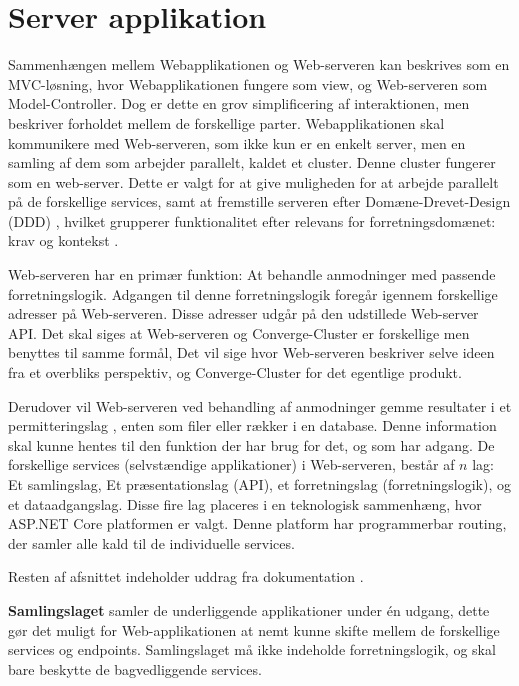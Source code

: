 
\section{Server applikation}

Sammenhængen mellem Webapplikationen og Web-serveren kan beskrives som en MVC-løsning, hvor Webapplikationen fungere som view, og Web-serveren som Model-Controller. Dog er dette en grov simplificering af interaktionen, men beskriver forholdet mellem de forskellige parter. Webapplikationen skal kommunikere med Web-serveren, som ikke kun er en enkelt server, men en samling af dem som arbejder parallelt, kaldet et cluster. Denne cluster fungerer som en web-server. Dette er valgt for at give muligheden for at arbejde parallelt på de forskellige services, samt at fremstille serveren efter Domæne-Drevet-Design (DDD) \cite[DDD]{converge-terms}, hvilket grupperer funktionalitet efter relevans for forretningsdomænet: krav og kontekst \cite{documentation-kravspec}.

Web-serveren har en primær funktion: At behandle anmodninger med passende forretningslogik. Adgangen til denne forretningslogik foregår igennem forskellige adresser på Web-serveren. Disse adresser udgår på den udstillede Web-server API. Det skal siges at Web-serveren og Converge-Cluster er forskellige men benyttes til samme formål, Det vil sige hvor Web-serveren beskriver selve ideen fra et overbliks perspektiv, og Converge-Cluster for det egentlige produkt.

Derudover vil Web-serveren ved behandling af anmodninger gemme resultater i et permitteringslag \cite[Permitteringslag]{converge-terms}, enten som filer eller rækker i en database. Denne information skal kunne hentes til den funktion der har brug for det, og som har adgang. De forskellige services (selvstændige applikationer) i Web-serveren,  består af $n$ lag: Et samlingslag, Et præsentationslag (API), et forretningslag (forretningslogik), og et dataadgangslag. Disse fire lag placeres i en teknologisk sammenhæng, hvor ASP.NET Core platformen er valgt. Denne platform har programmerbar routing, der samler alle kald til de individuelle services.

Resten af afsnittet indeholder uddrag fra dokumentation \cite{software-architecture}.



\textbf{Samlingslaget} samler de underliggende applikationer under én udgang, dette gør det muligt for Web-applikationen at nemt kunne skifte mellem de forskellige services og endpoints. Samlingslaget må ikke indeholde forretningslogik, og skal bare beskytte de bagvedliggende services.

